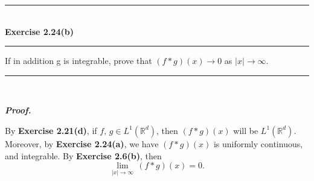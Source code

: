 \documentclass[a4paper,11pt]{article}
\begin{document}

\begin{flushleft}
	\rule[-0.5ex]{17cm}{2pt}\\
		\textbf{Exercise 2.24(b)}\\
	\rule[1.5ex]{17cm}{0.5pt}
		If in addition g is integrable, prove that $(f \ast g)(x) \to 0$ as $|x| \to \infty$.
	\rule[1.0ex]{17cm}{0.5pt}\
\end{flushleft}

\textbf{\textit{Proof.}}

By \textbf{Exercise 2.21(d)}, if $f,\,g \in L^1(\mathbb{R}^d)$, then $(f \ast g)(x)$ will be $L^1(\mathbb{R}^d)$. Moreover, by \textbf{Exercise 2.24(a)}, we have $(f \ast g)(x)$ is uniformly continuous, and integrable. By \textbf{Exercise 2.6(b)}, then
	$$\underset{|x| \to \infty}{\lim}\,(f \ast g)(x) = 0.$$


			
\end{document}
